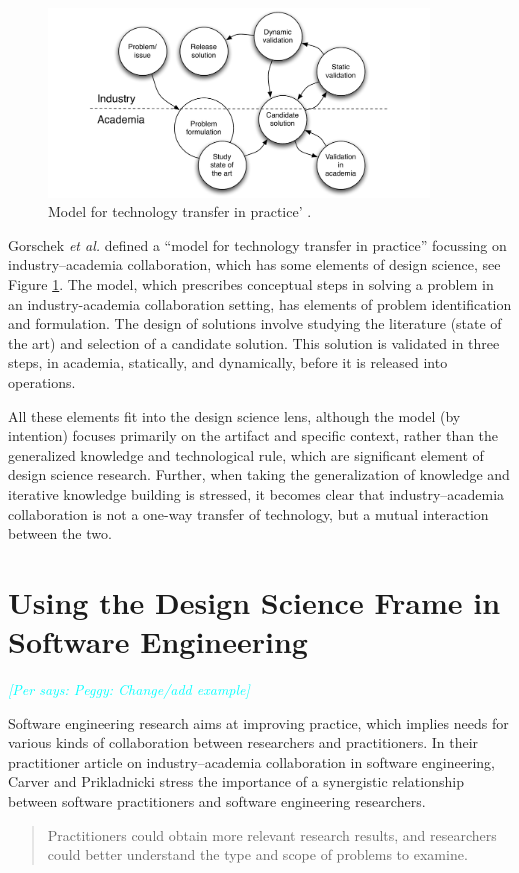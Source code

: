 \documentclass[graybox]{svmult}
\newcommand{\per}[1]{\textcolor{cyan}{{\it [Per says: #1]}}}
\newcommand{\per}[1]{}
\begin{document}
\begin{figure}[t]
  \includegraphics[width=0.9\textwidth]{Figures/GorschekModel.pdf}
\caption{Model for technology transfer in practice' \cite{GorschekSW2006}.}
\label{fig:GorschekModel}       %
\end{figure}

Gorschek \emph{et al.} defined a ``model for technology transfer in practice'' \cite{GorschekSW2006} focussing on industry--academia collaboration, which has some elements of design science, see Figure \ref{fig:GorschekModel}. The model, which prescribes conceptual steps in solving a problem in an industry-academia collaboration setting, has elements of problem identification and formulation. The design of solutions involve studying the literature (state of the art) and selection of a candidate solution. This solution is validated in three steps, in academia, statically, and dynamically, before it is released into operations. 

All these elements fit into the design science lens, although the model (by intention) focuses primarily on the artifact and specific context, rather than the generalized knowledge and technological rule, which are significant element of design science research. Further, when taking the generalization of knowledge and iterative knowledge building is stressed, it becomes clear that industry--academia collaboration is not a one-way transfer of technology, but a mutual interaction between the two.


\section{Using the Design Science Frame in Software Engineering}
\label{sec:UsingDSinSE}
\per {Peggy: Change/add example}

Software engineering research aims at improving practice, which implies needs for various kinds of collaboration between researchers and practitioners. In their practitioner article on industry--academia collaboration in software engineering, Carver and Prikladnicki stress the importance of a synergistic relationship between software practitioners and software engineering researchers.
\begin{quote}Practitioners could obtain more relevant research results, and researchers could better understand the type and scope of problems to examine.~\cite{CarverIEEESW2018}
\end{quote} 
\end{document}
